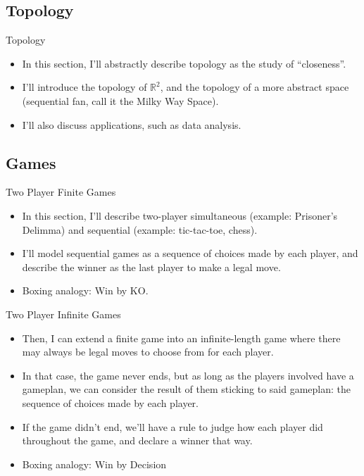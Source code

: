 \documentclass{beamer}
\begin{document}
\subsection{Topology}

\begin{frame}{Topology}

  \begin{itemize}
  \item
    In this section, I'll abstractly describe topology as the study of ``closeness''.
  \pause
  \item
    I'll introduce the topology of $\mathbb{R}^2$, and the topology of a more abstract space (sequential fan, call it the Milky Way Space).
  \pause
  \item
    I'll also discuss applications, such as data analysis.
  \end{itemize}
\end{frame}

\subsection{Games}

\begin{frame}{Two Player Finite Games}

  \begin{itemize}
  \item
    In this section, I'll describe two-player simultaneous (example: Prisoner's Delimma) and sequential (example: tic-tac-toe, chess).
  \pause
  \item
    I'll model sequential games as a sequence of choices made by each player, and describe the winner as the last player to make a legal move.
  \pause
  \item
    Boxing analogy: Win by KO.
  \end{itemize}
\end{frame}

\begin{frame}{Two Player Infinite Games}

  \begin{itemize}
  \item
    Then, I can extend a finite game into an infinite-length game where there may always be legal moves to choose from for each player.
  \pause
  \item
    In that case, the game never ends, but as long as the players involved have a gameplan, we can consider the result of them sticking to said gameplan: the sequence of choices made by each player.
  \pause
  \item
    If the game didn't end, we'll have a rule to judge how each player did throughout the game, and declare a winner that way.
  \pause
  \item
    Boxing analogy: Win by Decision
  \end{itemize}
\end{frame}
\end{document}
